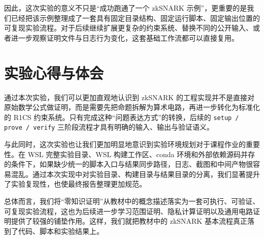 \documentclass[UTF8,a4paper,10pt]{ctexart}
\begin{document}
因此，这次实验的意义不只是“成功跑通了一个 zkSNARK 示例”，更重要的是我们已经把该示例整理成了一套具有固定目录结构、固定运行脚本、固定输出位置的可复现实验流程。对于后续继续扩展更复杂的约束系统、替换不同的公开输入、或者进一步观察证明文件与日志行为变化，这套基础工作流都可以直接复用。

\section{实验心得与体会}
通过本次实验，我们可以更加直观地认识到 zkSNARK 的工程实现并不是直接对原始数学公式做证明，而是需要先把命题拆解为算术电路，再进一步转化为标准化的 R1CS 约束系统。只有完成这种“问题表达方式”的转换，后续的 \texttt{setup / prove / verify} 三阶段流程才具有明确的输入、输出与验证语义。

与此同时，这次实验也让我们更加明显地意识到实验环境规划对于课程作业的重要性。在 WSL 完整实验目录、WSL 构建工作区、conda 环境和外部依赖源码并存的条件下，如果缺少统一的脚本入口与结果同步路径，日志、截图和中间产物很容易混乱。通过本次实现中对实验目录、构建目录与结果目录的分离，我们显著提升了实验复现性，也使最终报告整理更加规范。

总体而言，我们将“零知识证明”从教材中的概念描述落实为一套可执行、可验证、可复现实验流程，这也为后续进一步学习范围证明、隐私计算证明以及通用电路证明提供了较强的铺垫作用。这样，我们就把教材中的 zkSNARK 基本流程真正落到了代码、脚本和实验结果上。
\end{document}
